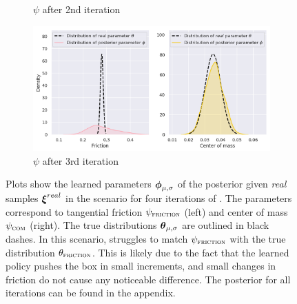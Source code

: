 \begin{figure}
\begin{subfigure}{0.45\textwidth}
  \caption{$\psi$ after 2nd iteration}
\end{subfigure}
\begin{subfigure}{0.45\textwidth}
  \centering
  \includegraphics[width=\linewidth]{img/yumi/latent-representation/yumi_latent_encoding_3_iter}
  \caption{$\psi$ after 3rd iteration}
\end{subfigure}
\caption{Plots show the learned parameters $\boldsymbol{\phi}_{\mu, \sigma}$ of the posterior given \emph{real} samples $\boldsymbol{\xi}^{real}$ in the \yp{} scenario for four iterations of \dettostoc{}.
The parameters correspond to tangential friction $\psi_{\textsc{friction}}$ (left) and center of mass $\psi_{\textsc{com}}$ (right). The true distributions $\boldsymbol{\theta}_{\mu, \sigma}$ are outlined in black dashes. In this scenario, \dettostoc{} struggles to match $\psi_{\textsc{friction}}{}$ with the true distribution $\theta_\textsc{friction}$. This is likely due to the fact that the learned policy pushes the box in small increments, and small changes in friction do not cause any noticeable difference. The posterior for all iterations can be found in the appendix.}
\label{fig:yumi_latent_space_full}
\end{figure}